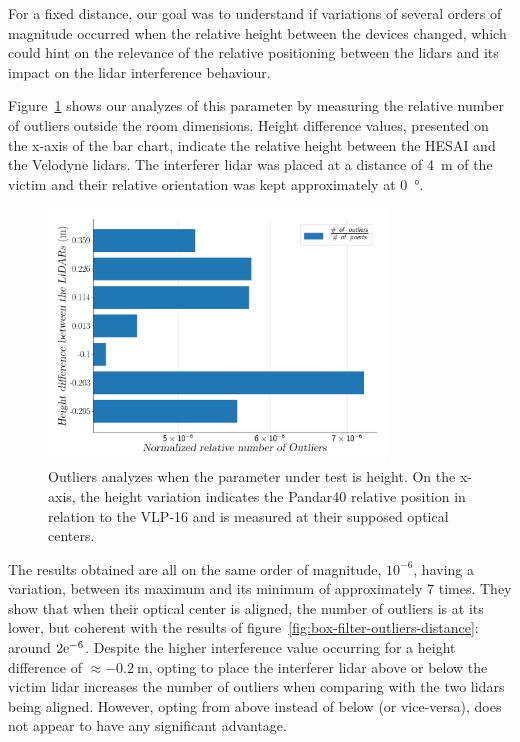 For a fixed distance, our goal was to understand if variations of several orders of magnitude occurred when the relative height between the devices changed, which could hint on the relevance of the relative positioning between the \acp{lidar} and its impact on the \ac{lidar} interference behaviour.

Figure~\ref{fig:box-filter-outliers-height} shows our analyzes of this parameter by measuring the relative number of outliers outside the room dimensions. Height difference values, presented on the x-axis of the bar chart, indicate the relative height between the HESAI and the Velodyne \acp{lidar}. The interferer \ac{lidar} was placed at a distance of \SI{4}{\meter} of the victim and their relative orientation was kept approximately at \SI{0}{\degree}.

\begin{figure}[!ht]
\centering
\includegraphics[width=0.8\textwidth]{img/lidar-interference/box-filtering/interference-box-filter-outliers-height.png}
\caption{Outliers analyzes when the parameter under test is height. On the x-axis, the height variation indicates the Pandar40 relative position in relation to the VLP-16 and is measured at their supposed optical centers.}
\label{fig:box-filter-outliers-height}
\end{figure}

The results obtained are all on the same order of magnitude, $10^{-6}$, having a variation, between its maximum and its minimum of approximately 7 times. They show that when their optical center is aligned, the number of outliers is at its lower, but coherent with the results of figure~\ref{fig:box-filter-outliers-distance}: around $2\mathrm{e}^{-6}$. Despite the higher interference value occurring for a height difference of $\approx \SI{-0.2}{\meter}$, opting to place the interferer \ac{lidar} above or below the victim \ac{lidar} increases the number of outliers when comparing with the two \acp{lidar} being aligned. However, opting from above instead of below (or vice-versa), does not appear to have any significant advantage. 

